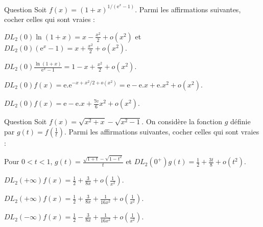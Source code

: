 \begin{multi}[multiple,feedback=
{On a : \(\displaystyle f(x)=\mathrm{exp}\left(\frac{\ln (1+x)}{\mathrm{e}^x-1}\right)\). Donc, pour écrire le \(\displaystyle DL_2(0)f(x)\), on utilise le \(DL_3(0)\ln (1+x)\) et le \(DL_3(0)(\mathrm{e}^x-1)\). La division suivants les puissances croissantes donne 
\[DL_2(0)\frac{\ln (1+x)}{\mathrm{e}^x-1}=1-x+\frac{2x^2}{3}+o(x^2).\]
Ensuite, avec \(\displaystyle \mathrm{e}^{1+u}=\mathrm{e}.\mathrm{e}^u=\mathrm{e}.\left(1+u+\frac{u^2}{2}+o(u^2)\right)\) où \(\displaystyle u=-x+\frac{2x^2}{3}+o(x^2)\), on obtient :
\[f(x)=\mathrm{e}-\mathrm{e}.x+\frac{7\mathrm{e}}{6}x^2+o(x^2).\]
}]{Question}
Soit \(\displaystyle f(x)=(1+x)^{1/(\mathrm{e}^x-1)}\). Parmi les affirmations suivantes, cocher celles qui sont vraies :

    \item* \(\displaystyle DL_2(0)\ln (1+x)=x-\frac{x^2}{2}+o(x^2)\) et \(\displaystyle DL_2(0)(\mathrm{e}^x-1)=x+\frac{x^2}{2}+o(x^2)\).
    \item \(\displaystyle DL_2(0)\frac{\ln (1+x)}{\mathrm{e}^x-1}=1-x+\frac{x^2}{2}+o(x^2)\).
    \item \(\displaystyle DL_2(0)f(x)=\mathrm{e}.\mathrm{e}^{-x+x^2/2+o(x^2)}=\mathrm{e}-\mathrm{e}.x+\mathrm{e}.x^2+o(x^2)\).
    \item* \(\displaystyle DL_2(0)f(x)=\mathrm{e}-\mathrm{e}.x+\frac{7\mathrm{e}}{6}x^2+o(x^2)\).
\end{multi}


\begin{multi}[multiple,feedback=
{On a : \(\displaystyle g(t)=\sqrt{\frac{1}{t^2}+\frac{1}{t}}-\sqrt{\frac{1}{t^2}-1}=\frac{\sqrt{1+t}-\sqrt{1-t^2}}{|t|}\). Donc, pour \(0<t<1\),
\[\displaystyle g(t)=\frac{\sqrt{1+t}-\sqrt{1-t^2}}{t}\Rightarrow DL_2(0^+)g(t)=\frac{1}{2}+\frac{3t}{8}+\frac{t^2}{16}+o(t^2).\]
Ainsi : \(\displaystyle DL_2(+\infty)f(x)=\frac{1}{2}+\frac{3}{8x}+\frac{1}{16x^2}+o\left(\frac{1}{x^2}\right)\). Pour \(-1<t<0\),
\[\displaystyle g(t)=\frac{\sqrt{1+t}-\sqrt{1-t^2}}{-t}\Rightarrow DL_2(0^-)g(t)=-\frac{1}{2}-\frac{3t}{8}-\frac{t^2}{16}+o(t^2).\]
D'où, \(\displaystyle DL_2(-\infty)f(x)=-\frac{1}{2}-\frac{3}{8x}-\frac{1}{16x^2}+o\left(\frac{1}{x^2}\right)\).
}]{Question}
Soit \(\displaystyle f(x)=\sqrt{x^2+x}-\sqrt{x^2-1}\). On considère la fonction \(g\) définie par \(\displaystyle g(t)=f\left(\frac{1}{t}\right)\). Parmi les affirmations suivantes, cocher celles qui sont vraies :

    \item Pour \(0<t<1\), \(\displaystyle g(t)=\frac{\sqrt{1+t}-\sqrt{1-t^2}}{t}\) et \(\displaystyle DL_2(0^+)g(t)=\frac{1}{2}+\frac{3t}{8}+o(t^2)\).
    \item \(\displaystyle DL_2(+\infty)f(x)=\frac{1}{2}+\frac{3}{8x}+o\left(\frac{1}{x^2}\right)\).
    \item* \(\displaystyle DL_2(+\infty)f(x)=\frac{1}{2}+\frac{3}{8x}+\frac{1}{16x^2}+o\left(\frac{1}{x^2}\right)\).
    \item \(\displaystyle DL_2(-\infty)f(x)=\frac{1}{2}-\frac{3}{8x}+\frac{1}{16x^2}+o\left(\frac{1}{x^2}\right)\).
\end{multi}


